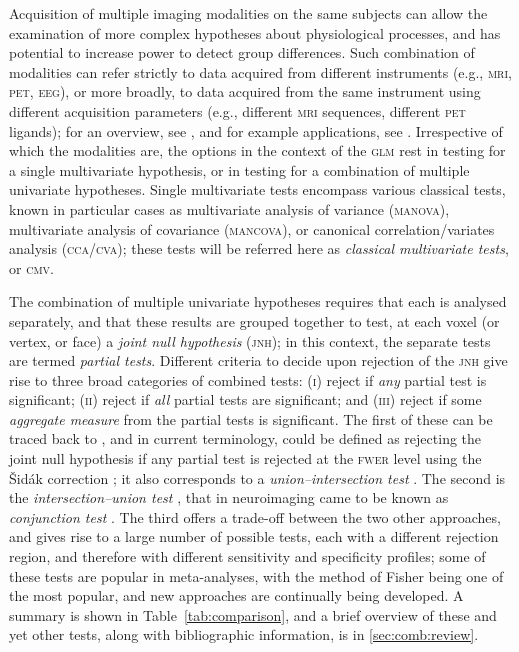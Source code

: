 Acquisition of multiple imaging modalities on the same subjects can allow the examination of more complex hypotheses about physiological processes, and has potential to increase power to detect group differences. Such combination of modalities can refer strictly to data acquired from different instruments (e.g., \textsc{mri}, \textsc{pet}, \textsc{eeg}), or more broadly, to data acquired from the same instrument using different acquisition parameters (e.g., different \textsc{mri} sequences, different \textsc{pet} ligands); for an overview, see \citet{Uludag2014,Zhu2014}, and for example applications, see \citet{Hayasaka2006, Thomas2015}. Irrespective of which the modalities are, the options in the context of the \textsc{glm} rest in testing for a single multivariate hypothesis, or in testing for a combination of multiple univariate hypotheses. Single multivariate tests encompass various classical tests, known in particular cases as multivariate analysis of variance (\textsc{manova}), multivariate analysis of covariance (\textsc{mancova}), or canonical correlation/variates analysis (\textsc{cca}/\textsc{cva}); these tests will be referred here as \emph{classical multivariate tests}, or \textsc{cmv}.

The combination of multiple univariate hypotheses requires that each is analysed separately, and that these results are grouped together to test, at each voxel (or vertex, or face) a \emph{joint null hypothesis} (\textsc{jnh}); in this context, the separate tests are termed \emph{partial tests}. Different criteria to decide upon rejection of the \textsc{jnh} give rise to three broad categories of combined tests: (\textsc{i}) reject if \emph{any} partial test is significant; (\textsc{ii}) reject if \emph{all} partial tests are significant; and (\textsc{iii}) reject if some \emph{aggregate measure} from the partial tests is significant. The first of these can be traced back to \citet{Tippett1931}, and in current terminology, could be defined as rejecting the joint null hypothesis if any partial test is rejected at the \textsc{fwer} level using the \v{S}id\'{a}k correction \citep{Sidak1967}; it also corresponds to a \emph{union--intersection test} \citep[\textsc{uit},][]{Roy1953}. The second is the \emph{intersection--union test} \citep[\textsc{iut},][]{Berger1982}, that in neuroimaging came to be known as \emph{conjunction test} \citep{Nichols2005}. The third offers a trade-off between the two other approaches, and gives rise to a large number of possible tests, each with a different rejection region, and therefore with different sensitivity and specificity profiles; some of these tests are popular in meta-analyses, with the method of Fisher \citep{Fisher1932} being one of the most popular, and new approaches are continually being developed. A summary is shown in Table~\ref{tab:comparison}, and a brief overview of these and yet other tests, along with bibliographic information, is in \ref{sec:comb:review}.

